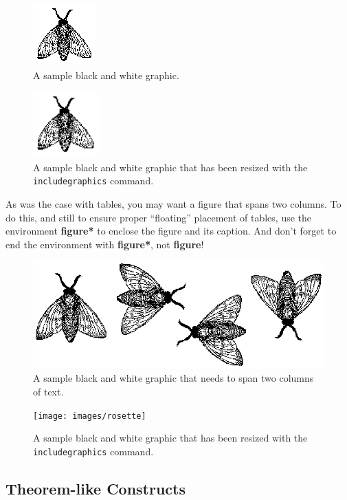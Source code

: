 \begin{figure}
\includegraphics{images/fly}
\caption{A sample black and white graphic.}
\end{figure}

\begin{figure}
\includegraphics[height=1in, width=1in]{images/fly}
\caption{A sample black and white graphic
that has been resized with the \texttt{includegraphics} command.}
\end{figure}


As was the case with tables, you may want a figure that spans two
columns.  To do this, and still to ensure proper ``floating''
placement of tables, use the environment \textbf{figure*} to enclose
the figure and its caption.  And don't forget to end the environment
with \textbf{figure*}, not \textbf{figure}!

\begin{figure}
\includegraphics{images/flies}
\caption{A sample black and white graphic
that needs to span two columns of text.}
\end{figure}


\begin{figure}
\texttt{[image: images/rosette]}
\caption{A sample black and white graphic that has
been resized with the \texttt{includegraphics} command.}
\end{figure}

\subsection{Theorem-like Constructs}

